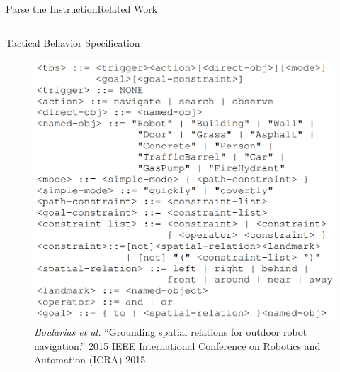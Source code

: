 \begin{frame}{Parse the Instruction}{Related Work}
\begin{columns}
	\begin{block}{Tactical Behavior Specification}
    \begin{minipage}[t][5.7cm][t]{\textwidth}
		\begin{figure}
			\centering
			\includegraphics[width=\linewidth]{figure/tactical_behavior_specification}
			\caption{ \tiny{ {\it Boularias et al. } ``Grounding spatial relations for outdoor robot navigation.'' 2015 IEEE International Conference on Robotics and Automation (ICRA) 2015. } }
		\end{figure}
	\end{minipage}
	\end{block}
\end{columns}

\end{frame}


